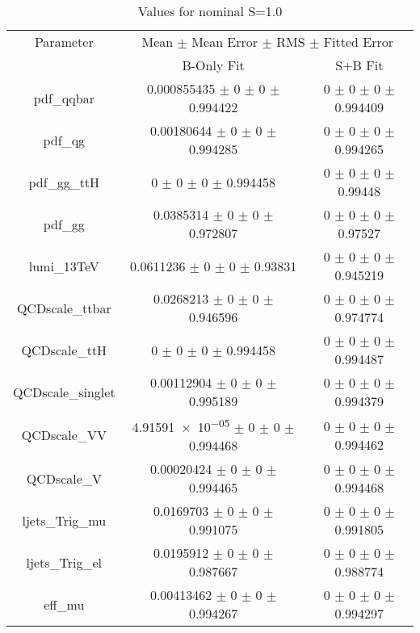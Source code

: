 \begin{table}
\centering
\caption{Values for nominal S=1.0}
\begin{tabular}{ccc}
\toprule
Parameter & \multicolumn{2}{c}{Mean $\pm$ Mean Error $\pm$ RMS $\pm$ Fitted Error}\\
 & B-Only Fit & S+B Fit\\
\midrule
pdf\_qqbar & \num{0.000855435} $\pm$ \num{0} $\pm$ \num{0} $\pm$ \num{0.994422} & \num{0} $\pm$ \num{0} $\pm$ \num{0} $\pm$ \num{0.994409}\\
pdf\_qg & \num{0.00180644} $\pm$ \num{0} $\pm$ \num{0} $\pm$ \num{0.994285} & \num{0} $\pm$ \num{0} $\pm$ \num{0} $\pm$ \num{0.994265}\\
pdf\_gg\_ttH & \num{0} $\pm$ \num{0} $\pm$ \num{0} $\pm$ \num{0.994458} & \num{0} $\pm$ \num{0} $\pm$ \num{0} $\pm$ \num{0.99448}\\
pdf\_gg & \num{0.0385314} $\pm$ \num{0} $\pm$ \num{0} $\pm$ \num{0.972807} & \num{0} $\pm$ \num{0} $\pm$ \num{0} $\pm$ \num{0.97527}\\
lumi\_13TeV & \num{0.0611236} $\pm$ \num{0} $\pm$ \num{0} $\pm$ \num{0.93831} & \num{0} $\pm$ \num{0} $\pm$ \num{0} $\pm$ \num{0.945219}\\
QCDscale\_ttbar & \num{0.0268213} $\pm$ \num{0} $\pm$ \num{0} $\pm$ \num{0.946596} & \num{0} $\pm$ \num{0} $\pm$ \num{0} $\pm$ \num{0.974774}\\
QCDscale\_ttH & \num{0} $\pm$ \num{0} $\pm$ \num{0} $\pm$ \num{0.994458} & \num{0} $\pm$ \num{0} $\pm$ \num{0} $\pm$ \num{0.994487}\\
QCDscale\_singlet & \num{0.00112904} $\pm$ \num{0} $\pm$ \num{0} $\pm$ \num{0.995189} & \num{0} $\pm$ \num{0} $\pm$ \num{0} $\pm$ \num{0.994379}\\
QCDscale\_VV & \num{4.91591e-05} $\pm$ \num{0} $\pm$ \num{0} $\pm$ \num{0.994468} & \num{0} $\pm$ \num{0} $\pm$ \num{0} $\pm$ \num{0.994462}\\
QCDscale\_V & \num{0.00020424} $\pm$ \num{0} $\pm$ \num{0} $\pm$ \num{0.994465} & \num{0} $\pm$ \num{0} $\pm$ \num{0} $\pm$ \num{0.994468}\\
ljets\_Trig\_mu & \num{0.0169703} $\pm$ \num{0} $\pm$ \num{0} $\pm$ \num{0.991075} & \num{0} $\pm$ \num{0} $\pm$ \num{0} $\pm$ \num{0.991805}\\
ljets\_Trig\_el & \num{0.0195912} $\pm$ \num{0} $\pm$ \num{0} $\pm$ \num{0.987667} & \num{0} $\pm$ \num{0} $\pm$ \num{0} $\pm$ \num{0.988774}\\
eff\_mu & \num{0.00413462} $\pm$ \num{0} $\pm$ \num{0} $\pm$ \num{0.994267} & \num{0} $\pm$ \num{0} $\pm$ \num{0} $\pm$ \num{0.994297}\\

\end{tabular}
\end{table}
